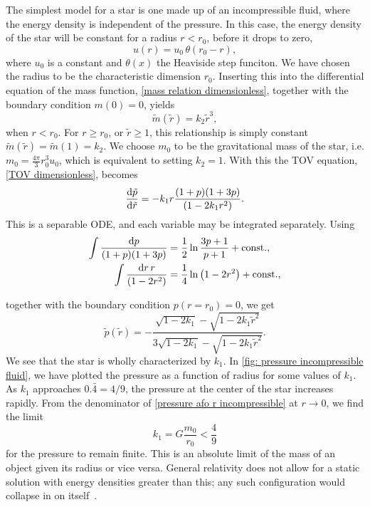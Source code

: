 The simplest model for a star is one made up of an incompressible fluid, where the energy density is independent of the pressure.
In this case, the energy density of the star will be constant for a radius $r < r_0$, before it drops to zero,
%
\begin{equation}
    u(r) = u_0 \, \theta (r_0 - r),
\end{equation}
%
where $u_0$ is a constant and $\theta(x)$ the Heaviside step funciton.
We have chosen the radius to be the characteristic dimension $r_0$.
Inserting this into the differential equation of the mass function, \autoref{mass relation dimensionless}, together with the boundary condition $m(0) = 0$, yields
%
\begin{equation}
    \tilde m(\tilde r) = k_2 \tilde r^3,
\end{equation}
%
when $r < r_0$.
For $r \geq r_0$, or $\tilde r \geq 1$, this relationship is simply constant $\tilde m(\tilde r) = \tilde m(1) = k_2$.
We choose $m_0$ to be the gravitational mass of the star, i.e. $m_0 = \frac{4 \pi }{3} r_0^3 u_0$, which is equivalent to setting $k_2 = 1$.
With this the TOV equation, \autoref{TOV dimensionless}, becomes
%
\begin{equation} 
    \diff{\tilde p}{\tilde r} = - k_1 r \frac{(1 + p)(1 + 3 p)}{(1 - 2 k_1 r^2)}.
\end{equation}
%
This is a separable ODE, and each variable may be integrated separately.
Using
%
\begin{align}
    \int \frac{\text{d} p}{(1 + p)(1 + 3p)} 
    & = \frac{1}{2} \ln \frac{3p + 1}{p + 1} + \mathrm{const.} , \\
    \int \frac{\text{d} r \, r}{(1 - 2 r^2)} 
    & = \frac{1}{4}\ln\left(1 - 2 r^2 \right)
    + \mathrm{const.},
\end{align}
%

together with the boundary condition $p(r = r_0) = 0$, we get 
%
\begin{equation}
    \label{pressure afo r incompressible}
    \tilde p(\tilde r) 
    = 
    - \frac{\sqrt{1 - 2 k_1} - \sqrt{1 - 2 k_1 \tilde r^2}}{3 \sqrt{1 - 2 k_1 } - \sqrt{1 - 2 k_1 \tilde r^2}}.
\end{equation}
%
We see that the star is wholly characterized by $k_1$.
In \autoref{fig: pressure incompressible fluid}, we have plotted the pressure as a function of radius for some values of $k_1$.
As $k_1$ approaches $0.\bar 4 = 4/9$, the pressure at the center of the star increases rapidly.
From the denominator of \autoref{pressure afo r incompressible} at $r\rightarrow 0$, we find the limit
%
\begin{equation}
    k_1 = G \frac{m_0}{r_0} < \frac{4}{9}
\end{equation}
%
for the pressure to remain finite.
This is an absolute limit of the mass of an object given its radius or vice versa.
General relativity does not allow for a static solution with energy densities greater than this; any such configuration would collapse in on itself~\autocite{carrollSpacetimeGeometryIntroduction2019}.

